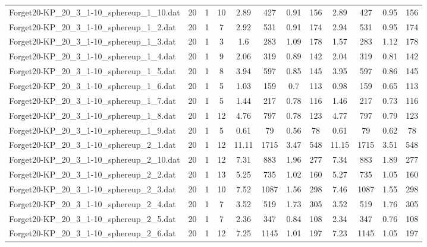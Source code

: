 \begin{sidewaystable}[!ht]
{\begin{tabular}{lccccccccccc}
Forget20-KP\_20\_3\_1-10\_sphereup\_1\_10.dat & 20 & 1 & 10 & 2.89 & 427 &  \textcolor{blue2}{0.91} & 156 & 2.89 & 427 & 0.95 & 156 \\
Forget20-KP\_20\_3\_1-10\_sphereup\_1\_2.dat & 20 & 1 & 7 & 2.92 & 531 & 0.91 & 174 & 2.94 & 531 & 0.95 & 174 \\
Forget20-KP\_20\_3\_1-10\_sphereup\_1\_3.dat & 20 & 1 & 3 & 1.6 & 283 &  \textcolor{blue2}{1.09} & 178 & 1.57 & 283 & 1.12 & 178 \\
Forget20-KP\_20\_3\_1-10\_sphereup\_1\_4.dat & 20 & 1 & 9 & 2.06 & 319 & 0.89 & 142 & 2.04 & 319 &  \textcolor{blue2}{0.81} & 142 \\
Forget20-KP\_20\_3\_1-10\_sphereup\_1\_5.dat & 20 & 1 & 8 & 3.94 & 597 &  \textcolor{blue2}{0.85} & 145 & 3.95 & 597 & 0.86 & 145 \\
Forget20-KP\_20\_3\_1-10\_sphereup\_1\_6.dat & 20 & 1 & 5 & 1.03 & 159 & 0.7 & 113 & 0.98 & 159 &  \textcolor{blue2}{0.65} & 113 \\
Forget20-KP\_20\_3\_1-10\_sphereup\_1\_7.dat & 20 & 1 & 5 & 1.44 & 217 & 0.78 & 116 & 1.46 & 217 & 0.73 & 116 \\
Forget20-KP\_20\_3\_1-10\_sphereup\_1\_8.dat & 20 & 1 & 12 & 4.76 & 797 &  \textcolor{blue2}{0.78} & 123 & 4.77 & 797 & 0.79 & 123 \\
Forget20-KP\_20\_3\_1-10\_sphereup\_1\_9.dat & 20 & 1 & 5 & 0.61 & 79 &  \textcolor{blue2}{0.56} & 78 & 0.61 & 79 & 0.62 & 78 \\
Forget20-KP\_20\_3\_1-10\_sphereup\_2\_1.dat & 20 & 1 & 12 & 11.11 & 1715 &  \textcolor{blue2}{3.47} & 548 & 11.15 & 1715 & 3.51 & 548 \\
Forget20-KP\_20\_3\_1-10\_sphereup\_2\_10.dat & 20 & 1 & 12 & 7.31 & 883 & 1.96 & 277 & 7.34 & 883 &  \textcolor{blue2}{1.89} & 277 \\
Forget20-KP\_20\_3\_1-10\_sphereup\_2\_2.dat & 20 & 1 & 13 & 5.25 & 735 &  \textcolor{blue2}{1.02} & 160 & 5.27 & 735 & 1.05 & 160 \\
Forget20-KP\_20\_3\_1-10\_sphereup\_2\_3.dat & 20 & 1 & 10 & 7.52 & 1087 & 1.56 & 298 & 7.46 & 1087 & 1.55 & 298 \\
Forget20-KP\_20\_3\_1-10\_sphereup\_2\_4.dat & 20 & 1 & 7 & 3.52 & 519 &  \textcolor{blue2}{1.73} & 305 & 3.52 & 519 & 1.76 & 305 \\
Forget20-KP\_20\_3\_1-10\_sphereup\_2\_5.dat & 20 & 1 & 7 & 2.36 & 347 & 0.84 & 108 & 2.34 & 347 &  \textcolor{blue2}{0.76} & 108 \\
Forget20-KP\_20\_3\_1-10\_sphereup\_2\_6.dat & 20 & 1 & 12 & 7.25 & 1145 &  \textcolor{blue2}{1.01} & 197 & 7.23 & 1145 & 1.05 & 197 \\

\end{tabular}}
\end{sidewaystable}
